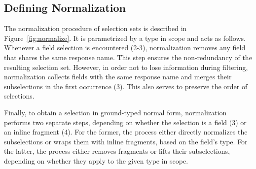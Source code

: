 \subsection{Defining Normalization}\label{subsec:normalization}




The normalization procedure of selection sets is described in
Figure~\ref{fig:normalize}. It is parametrized by a type in scope and
acts as follows. Whenever a field selection is encountered (2-3),
normalization removes any field that shares the same response
name. This step ensures the non-redundancy of the resulting selection
set.  However, in order not to lose information during filtering,
normalization collects fields with the same response name and merges
their subselections in the first occurrence (3). This also serves to
preserve the order of selections.

Finally, to obtain a selection in ground-typed normal form,
normalization performs two separate steps, depending on whether the
selection is a field (3) or an inline fragment (4). For the former,
the process either directly normalizes the subselections or wraps them
with inline fragments, based on the field's type.  For the latter, the
process either removes fragments or lifts their subselections,
depending on whether they apply to the given type in scope.

